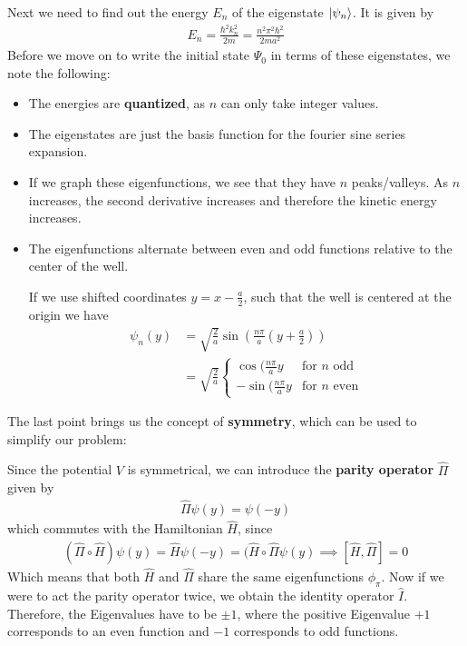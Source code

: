 Next we need to find out the energy $E_n$ of the eigenstate $\ket{\psi_n}$. It is given by
\begin{align*}
E_n = \frac{\hbar^2 k_n^2}{2m} = \frac{n^2 \pi^2 \hbar^2}{2ma^2}
\end{align*}
Before we move on to write the initial state $\Psi_0$ in terms of these eigenstates, we note the following:
\begin{itemize}
	\item The energies are \textbf{quantized}, as $n$ can only take integer values.
	\item The eigenstates are just the basis function for the fourier sine series expansion.
	\item If we graph these eigenfunctions, we see that they have $n$ peaks/valleys. As $n$ increases, the second derivative increases and therefore the kinetic energy increases.
	\item The eigenfunctions alternate between even and odd functions relative to the center of the well.

				If we use shifted coordinates $y = x - \frac{a}{2}$, such that the well is centered at the origin we have
\begin{align*}
	\psi_n(y) &= \sqrt{\frac{2}{a}} \sin \left(\frac{n \pi}{a}(y + \frac{a}{2})\right)\\
	&= \sqrt{\frac{2}{a}} \left\{\begin{array}{ll}
			\cos(\frac{n \pi}{a}y & \text{for $n$ odd} \\
		-\sin(\frac{n \pi}{a}y & \text{for $n$ even}
	\end{array} \right.
\end{align*}
\end{itemize}
The last point brings us the concept of \textbf{symmetry}, which can be used to simplify our problem:

Since the potential $V$ is symmetrical, we can introduce the \textbf{parity operator} $\hat{\Pi}$ given by
\begin{align*}
	\hat{\Pi}\psi(y) = \psi(-y)
\end{align*}
which commutes with the Hamiltonian $\hat{H}$, since
\begin{align*}
	(\hat{\Pi} \circ \hat{H}) \psi(y) = \hat{H}\psi(-y) = (\hat{H} \circ \hat{\Pi} \psi(y) \implies [\hat{H}, \hat{\Pi}] = 0
\end{align*}
Which means that both $\hat{H}$ and $\hat{\Pi}$ share the same eigenfunctions $\phi_\pi$. 
Now if we were to act the parity operator twice, we obtain the identity operator $\hat{I}$. Therefore, the Eigenvalues have to be $\pm 1$, where the positive Eigenvalue $+1$ corresponds to an even function and $-1$ corresponds to odd functions.\\

